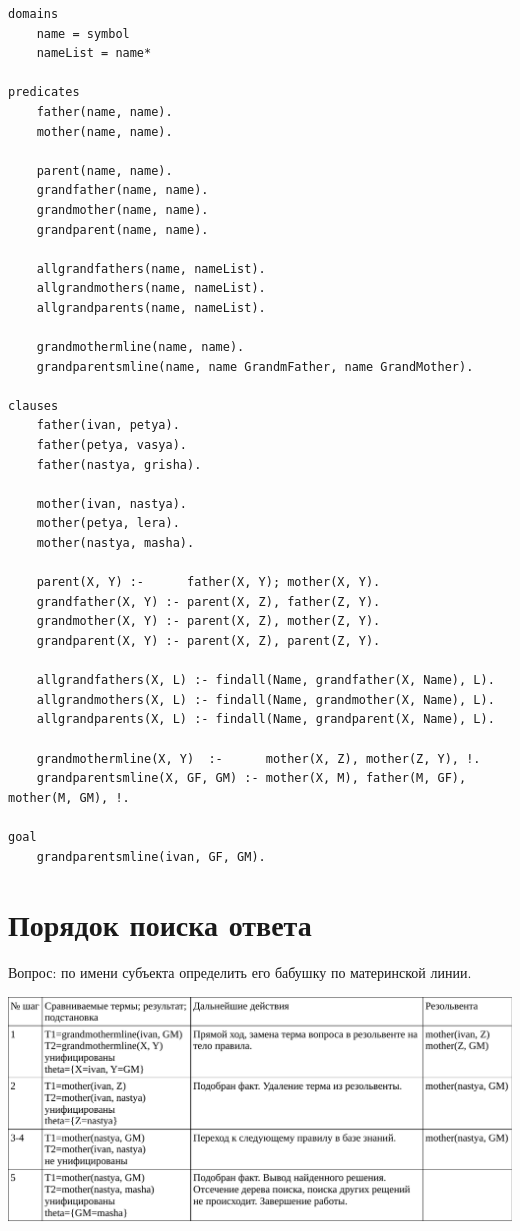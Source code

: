 \begin{lstlisting}
domains
	name = symbol
	nameList = name*

predicates
	father(name, name).
	mother(name, name).

	parent(name, name).
	grandfather(name, name).
	grandmother(name, name).
	grandparent(name, name).
	
	allgrandfathers(name, nameList).
	allgrandmothers(name, nameList).
	allgrandparents(name, nameList).

	grandmothermline(name, name).
	grandparentsmline(name, name GrandmFather, name GrandMother).

clauses
	father(ivan, petya).
	father(petya, vasya).
	father(nastya, grisha).

	mother(ivan, nastya).
	mother(petya, lera).
	mother(nastya, masha).
	
	parent(X, Y) :- 	 father(X, Y); mother(X, Y).
	grandfather(X, Y) :- parent(X, Z), father(Z, Y).
	grandmother(X, Y) :- parent(X, Z), mother(Z, Y).
	grandparent(X, Y) :- parent(X, Z), parent(Z, Y).
	
	allgrandfathers(X, L) :- findall(Name, grandfather(X, Name), L).
	allgrandmothers(X, L) :- findall(Name, grandmother(X, Name), L).
	allgrandparents(X, L) :- findall(Name, grandparent(X, Name), L).
	
	grandmothermline(X, Y) 	:-      mother(X, Z), mother(Z, Y), !.
	grandparentsmline(X, GF, GM) :- mother(X, M), father(M, GF), mother(M, GM), !.

goal
	grandparentsmline(ivan, GF, GM).
\end{lstlisting}

\clearpage

{\large\section*{Порядок поиска ответа}}

Вопрос: по имени субъекта определить его бабушку по материнской линии.

\vspace*{5mm}

\begin{center}
	\includegraphics[width=0.95\linewidth]{table.pdf}
\end{center}
